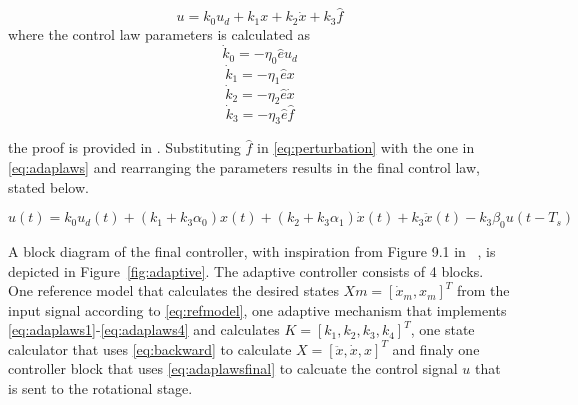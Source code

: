\begin{equation}
  \label{eq:adaplaws}
  u = k_0u_d + k_1x + k_2\dot{x} + k_3\hat{f}
\end{equation}
where the control law parameters is calculated as
\begin{equation}
  \label{eq:adaplaws1}
  \dot{k}_0 = -\eta_0\hat{e}u_d
\end{equation}
\begin{equation}
  \label{eq:adaplaws2}
  \dot{k}_1 = -\eta_1\hat{e}x
\end{equation}
\begin{equation}
  \label{eq:adaplaws3}
  \dot{k}_2 = -\eta_2\hat{e}\dot{x}
\end{equation}
\begin{equation}
  \label{eq:adaplaws4}
  \dot{k}_3 = -\eta_3\hat{e}\hat{f}
\end{equation}

the proof is provided in \citep{Qingson:2016}. Substituting $\hat{f}$ in \eqref{eq:perturbation} with the one in \eqref{eq:adaplaws} and rearranging the parameters results in the final \abbrMRACPE control law, stated below.

\begin{equation}
    \label{eq:adaplawsfinal}
  u(t) = k_0u_d(t) + (k_1 + k_3\alpha_0)x(t) +  (k_2 + k_3\alpha_1)\dot{x}(t) + k_3\ddot{x}(t) - k_3\beta_0u(t-T_s)
\end{equation}

A block diagram of the final controller, with inspiration from Figure 9.1 in ~\citep{Qingson:2016}, is depicted in Figure~\ref{fig:adaptive}. The adaptive controller consists of 4 blocks. One reference model that calculates the desired states $Xm=[\dot{x}_m, x_m]^T$ from the input signal according to \eqref{eq:refmodel}, one adaptive mechanism that implements \eqref{eq:adaplaws1}-\eqref{eq:adaplaws4} and calculates $K=[k_1, k_2, k_3, k_4]^T$, one state calculator that uses \eqref{eq:backward} to calculate $X=[\ddot{x}, \dot{x}, x]^T$ and finaly one controller block that uses \eqref{eq:adaplawsfinal} to calcuate the control signal $u$ that is sent to the rotational stage.

